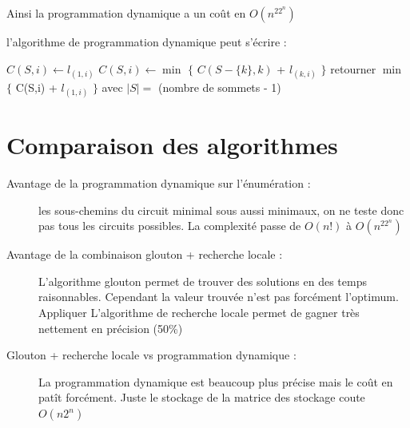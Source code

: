 \documentclass[11pt]{article} \usepackage[top=2cm, bottom=2cm, left=2cm, right=2cm]{geometry}
\begin{document}
Ainsi la programmation dynamique a un coût en $O(n^22^n)$

l'algorithme de programmation dynamique peut s'écrire :
\begin{algorithmic}[]
\State $C(S,i) \gets l_{(1,i)}$
\EndFor
\Else
{}
\State $C(S,i) \gets \min$ $\{$ $C(S - \{ k \} ,k)$ + $l_{(k,i)}$ $\}$
\EndFor
\EndFor
\EndIf
\EndFor
\State retourner $\min$ $\{$ C(S,i) + $l_{(1,i)}$ $\}$ avec $|S| = $
(nombre de sommets - 1)
\end{algorithmic}

\section{Comparaison des algorithmes}
\begin{description}
    \item[Avantage de la programmation dynamique sur l'énumération :] les sous-chemins du circuit minimal sous aussi
  minimaux, on ne teste donc pas tous les circuits possibles. La complexité passe de $O(n!)$ à $O(n^22^n)$
  \item[Avantage de la combinaison glouton + recherche locale :] L'algorithme glouton permet de trouver des solutions en
des temps raisonnables. Cependant la valeur trouvée n'est pas forcément l'optimum. Appliquer L'algorithme de recherche
locale permet de gagner très nettement en précision (50\%)
\item[Glouton + recherche locale vs programmation dynamique :] La programmation dynamique est beaucoup plus précise mais
le coût en patît forcément. Juste le stockage de la matrice des stockage coute $O(n2^n)$

\end{description}
\end{document}
